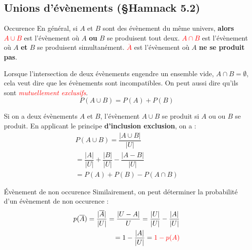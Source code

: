 \documentclass[8pt]{report}
\begin{document}
\begin{multicols*}{2}
        \section{Unions d'évènements (\S Hamnack 5.2)}

        \begin{Definitionx}{Occurence}{}
            En général, si $A$ et $B$ sont des évènement du même univers, \textbf{alors} 
            \textcolor{red}{$A \cup B$} est l'évènement où $A$ \textbf{ou} $B$ se produisent tout deux. 
            \textcolor{red}{$A \cap B$} est l'évènement où $A$ \textbf{et}  $B$ se produisent 
            simultanément. \textcolor{red}{$\overline{A}$} est l'évènement où $A$ \textbf{ne se produit pas}.     
        \end{Definitionx}

                \begin{note}{}{}
                    Lorsque l'intersection de deux évènements engendre un ensemble vide, $A \cap B = \emptyset$, 
                    cela veut dire que les évènements sont incompatibles. On peut aussi dire qu'ils sont 
                    \textcolor{red}{\textit{mutuellement exclusifs}}.   
                    \[ P(A \cup B) = P(A) + P(B) \]
                \end{note}


        \noindent Si on a deux évènements $A$ et $B$, l'évènement $A \cup B$ se produit si $A$ ou  ou $B$ se
        produit. En applicant le principe \textbf{d'inclusion exclusion}, on a : 
                \begin{align*}
                 P(A \cup B) = \dfrac{|A \cup B|}{|U|} \\ 
                = \dfrac{|A|}{|U|}+ \dfrac{|B|}{|U|} - \dfrac{|A - B|}{|U|} \\ 
                = P(A) + P(B) - P(A \cap B)
                \end{align*}

        
        \begin{Definitionx}{Évènement de non occurence}{}
            Similairement, on peut déterminer la probabilité d'un évènement de non occurence :
            \begin{align*}
                p(\overline{A}) = \dfrac{|\overline{A}|}{|U|} = \dfrac{|U - A|}{U} 
                                = \dfrac{|U|}{|U|} - \dfrac{|A|}{|U|}  
                                \\ =  1 - \dfrac{|A|}{|U|} = \textcolor{red}{1 - p(A)}
            \end{align*}
        \end{Definitionx}




\end{multicols*}
\end{document}
